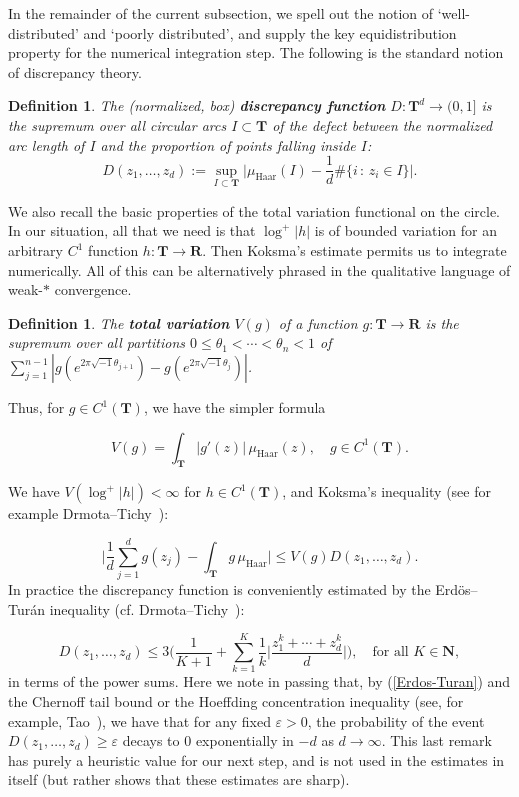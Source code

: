 \documentclass[10pt]{amsart}
\def\NwithzeroB{\mathbf{N}}
\def\NwithzeroA{\NwithzeroB}
\def\T{\mathbf{T}}
\def\R{\mathbf{R}}
\newtheorem{df}[subsubsection]{Definition}
\theoremstyle{remark}
\numberwithin{equation}{subsection}
\def\numequation{\addtocounter{subsubsection}{1}\begin{equation}}
\begin{document}
In the remainder of the current subsection, we spell out the notion of `well-distributed' and `poorly distributed', and supply the key equidistribution property for the numerical integration step. The following is the standard notion of discrepancy theory. 

\begin{df}
The (normalized, box) {\bf discrepancy function} $D : \T^d \to (0,1]$ is the supremum over all circular arcs
$I \subset \T$ of the defect between the normalized arc length of $I$ and the proportion of points falling inside $I$: 
$$
D(z_1, \ldots, z_d) := \sup_{I \subset \T} \big| \mu_{\mathrm{Haar}}(I) - \frac{1}{d}  \# \{ i \, : \, z_i \in I \}  \big|.
$$
\end{df}

We also recall the basic properties of the total variation functional on the circle. In our situation, all that we need is that $\log^+{|h|}$ is of bounded variation 
for an arbitrary $C^1$ function $h : \T \to \R$. Then Koksma's estimate permits us to integrate numerically. All of this can be alternatively phrased 
in the qualitative language of  weak-$*$ convergence.



\begin{df}
The {\bf total variation} $V(g)$ of a function $g : \T \to \R$ is the supremum over all partitions $0 \leq \theta_1 < \cdots < \theta_n < 1$ of $\sum_{j=1}^{n-1} | g(e^{2\pi \sqrt{-1} \theta_{j+1}}) - g(e^{2\pi \sqrt{-1} \theta_j}) |$. 
\end{df}

Thus, for $g \in C^1(\T)$, we have the simpler formula 
\numequation \label{total variation}
V(g) = \int_{\T} |g'(z)| \, \mu_{\mathrm{Haar}}(z), \quad g \in C^1(\T). 
\end{equation}

We have $V(\log^+{|h|}) < \infty$ for $h \in C^1(\T)$, and Koksma's inequality (see for example Drmota--Tichy~\cite[Theorem~1.14]{DrmotaTichy}):
\numequation \label{Koksma}
\Big| \frac{1}{d} \sum_{j=1}^d g(z_j) - \int_{\T} g \, \mu_{\mathrm{Haar}} \Big| \leq V(g) D(z_1, \ldots, z_d).
\end{equation}
In practice the discrepancy function is conveniently estimated by the  Erd\"os--Tur\'an  inequality (cf. Drmota--Tichy~\cite[Theorem~1.21]{DrmotaTichy}):
\numequation \label{Erdos-Turan}
D(z_1, \ldots, z_d) \leq 3 \Big(  \frac{1}{K+1} + \sum_{k=1}^K \frac{1}{k} \Big| \frac{z_1^k + \cdots + z_d^k}{d} \Big| \Big), \quad \textrm{for all } K \in \NwithzeroA,
\end{equation}
 in terms of the power sums. 
 Here we note in passing that, by (\ref{Erdos-Turan}) and the Chernoff tail bound or the Hoeffding concentration inequality (see, for example, Tao~\cite[Theorem~2.1.3 and Ex.~2.1.4]{Tao}), 
 we have that for any fixed $\varepsilon > 0$, the probability 
of the event $D(z_1, \ldots, z_d) \geq \varepsilon$ decays to $0$ exponentially in $-d$ as $d \to \infty$. This last remark has purely a heuristic value for our next step, and is not used in the estimates in itself (but rather shows that these estimates are sharp).  
\end{document}
